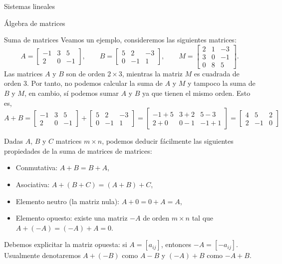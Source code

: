 \documentclass[a4paper,12pt,twoside,spanish,reqno]{amsbook}
\theoremstyle{definition}
\theoremstyle{remark}
\begin{document}
\begin{chapter}{Sistemas lineales}
\begin{section}{Álgebra de matrices}
\begin{subsection}{Suma  de matrices}
                Veamos un ejemplo, consideremos las siguientes matrices:
                \begin{equation*}
                A = \begin{bmatrix} -1&3&5 \\ 2&0&-1  \end{bmatrix}, \qquad
                B = \begin{bmatrix} 5&2&-3 \\ 0&-1&1  \end{bmatrix}, \qquad
                M = \begin{bmatrix} 2&1&-3 \\ 3&0&-1 \\ 0&8&5 \end{bmatrix}.
                \end{equation*}
                Las matrices $A$ y $B$ son de orden $2 \times 3$, mientras la matriz $M$ es cuadrada de orden 3. Por tanto, no podemos calcular la suma de $A$ y $M$ y tampoco la suma de $B$ y $M$, en cambio, sí podemos sumar $A$ y $B$ ya que tienen el mismo orden. Esto es,
                \begin{equation*}
                A + B = \begin{bmatrix} -1&3&5 \\ 2&0&-1  \end{bmatrix}+
                \begin{bmatrix} 5&2&-3 \\ 0&-1&1  \end{bmatrix} =
                \begin{bmatrix} -1+5&3+2&5-3 \\ 2+0&0-1&-1+1  \end{bmatrix}=
                \begin{bmatrix} 4&5&2 \\ 2&-1&0  \end{bmatrix}
                \end{equation*}
                
                
                Dadas $A$, $B$ y $C$ matrices $m \times n$, podemos deducir fácilmente las siguientes propiedades de la suma de matrices de matrices:
                \begin{itemize}
                    \item Conmutativa: $A + B = B + A$,
                    \item Asociativa: $A + (B + C) = (A + B) + C$,
                    \item Elemento neutro (la matriz nula): $A + 0 = 0 + A = A$,
                    \item Elemento opuesto: existe una matriz $-A$ de orden $m \times n$ tal que  $A + (-A) = (-A) + A = 0$.
                \end{itemize}
                Debemos explicitar la matriz opuesta: si $A = [a_{ij}]$,  entonces $-A = [-a_{ij}]$. Usualmente denotaremos $A + (-B)$ como $A-B$ y $(-A)+B$ como $-A+B$. 
                

\end{subsection}
\end{section}
\end{chapter}
\end{document}
